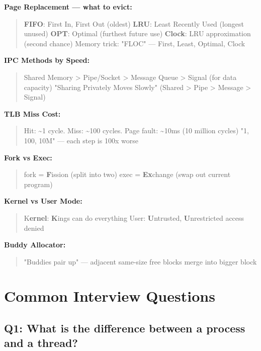 \documentclass[11pt]{article}
\begin{document}
\textbf{Page Replacement --- what to evict:}

\begin{quote}
\textbf{FIFO}: First In, First Out (oldest)
\textbf{LRU}: Least Recently Used (longest unused)
\textbf{OPT}: Optimal (furthest future use)
\textbf{Clock}: LRU approximation (second chance)
Memory trick: "FLOC" --- First, Least, Optimal, Clock
\end{quote}

\textbf{IPC Methods by Speed:}

\begin{quote}
Shared Memory \textgreater{} Pipe/Socket \textgreater{} Message Queue \textgreater{} Signal (for data capacity)
"Sharing Privately Moves Slowly" (Shared \textgreater{} Pipe \textgreater{} Message \textgreater{} Signal)
\end{quote}

\textbf{TLB Miss Cost:}

\begin{quote}
Hit: \textasciitilde1 cycle. Miss: \textasciitilde100 cycles. Page fault: \textasciitilde10ms (10 million cycles)
"1, 100, 10M" --- each step is 100x worse
\end{quote}

\textbf{Fork vs Exec:}

\begin{quote}
fork = \textbf{F}ission (split into two)
exec = \textbf{Ex}change (swap out current program)
\end{quote}

\textbf{Kernel vs User Mode:}

\begin{quote}
K\textbf{ernel}: \textbf{K}ings can do everything
User: \textbf{U}ntrusted, \textbf{U}nrestricted access denied
\end{quote}

\textbf{Buddy Allocator:}

\begin{quote}
"Buddies pair up" --- adjacent same-size free blocks merge into bigger block
\end{quote}

\section{Common Interview Questions}\label{common-interview-questions}

\subsection{Q1: What is the difference between a process and a thread?}\label{q1-what-is-the-difference-between-a-process-and-a-thread}
\end{document}
